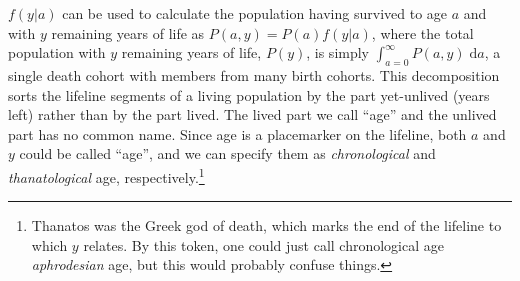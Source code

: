 \documentclass{article}
\newcommand{\dd}{\; \mathrm{d}}
\begin{document}
$f(y|a)$ can be used to calculate the population having survived to age $a$ and
with $y$ remaining years of life as $P(a,y) = P(a)f(y|a)$, where the total
population with $y$ remaining years of life, $P(y)$, is simply $\int
_{a=0}^\infty P(a,y) \dd a$, a single death cohort with members from many birth
cohorts. This decomposition sorts the lifeline segments of a living population
by the part yet-unlived (years left) rather than by the part lived. The lived
part we call ``age'' and the unlived part has no common name. Since age is a
placemarker on the lifeline, both $a$ and $y$ could be called ``age'', and we
can specify them as \textit{chronological} and \textit{thanatological} age,
respectively.\footnote{Thanatos was the Greek god of death, which marks the end of the lifeline to which $y$ relates. By this token, one could just call chronological age \textit{aphrodesian} age, but this would probably confuse things.}
\end{document}
